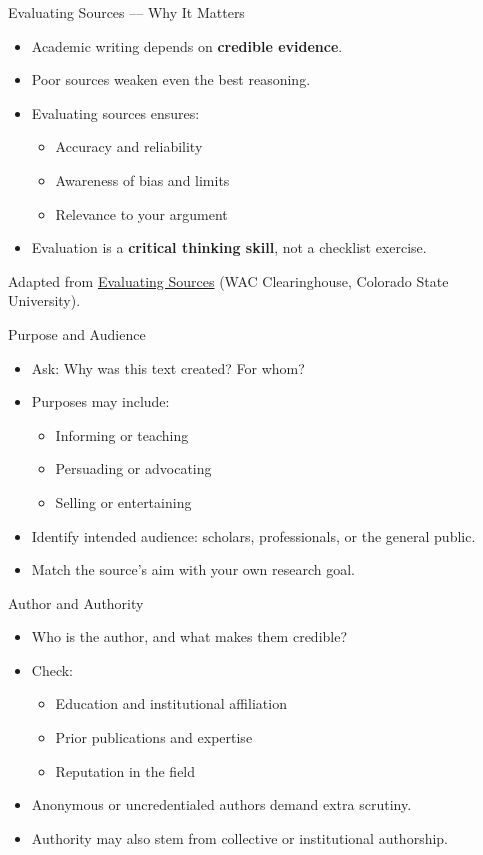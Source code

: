 \documentclass[aspectratio=169]{beamer}
\begin{document}
\begin{frame}{Evaluating Sources — Why It Matters}
\begin{itemize}
  \item Academic writing depends on \textbf{credible evidence}.
  \item Poor sources weaken even the best reasoning.
  \item Evaluating sources ensures:
    \begin{itemize}
      \item Accuracy and reliability
      \item Awareness of bias and limits
      \item Relevance to your argument
    \end{itemize}
  \item Evaluation is a \textbf{critical thinking skill}, not a checklist exercise.
  \end{itemize}

  \vfill
 Adapted from \href{https://wac.colostate.edu/resources/writing/guides/evaluating/}{Evaluating Sources} (WAC Clearinghouse, Colorado State University).  
\end{frame}

\begin{frame}{Purpose and Audience}
\begin{itemize}
  \item Ask: Why was this text created? For whom?
  \item Purposes may include:
    \begin{itemize}
      \item Informing or teaching
      \item Persuading or advocating
      \item Selling or entertaining
    \end{itemize}
  \item Identify intended audience: scholars, professionals, or the general public.
  \item Match the source’s aim with your own research goal.
\end{itemize}
\end{frame}

\begin{frame}{Author and Authority}
\begin{itemize}
  \item Who is the author, and what makes them credible?
  \item Check:
    \begin{itemize}
      \item Education and institutional affiliation
      \item Prior publications and expertise
      \item Reputation in the field
    \end{itemize}
  \item Anonymous or uncredentialed authors demand extra scrutiny.
  \item Authority may also stem from collective or institutional authorship.
\end{itemize}
\end{frame}
\end{document}
